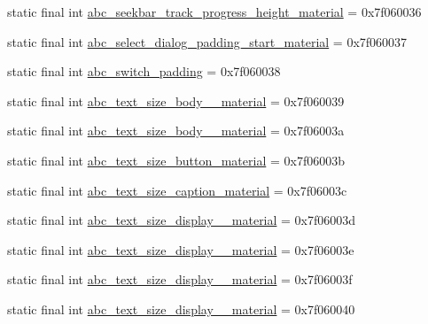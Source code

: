 \begin{DoxyCompactItemize}
\item 
static final int \mbox{\hyperlink{classandroid_1_1support_1_1design_1_1_r_1_1dimen_adbd12b1ded065c1a2ebba69f73914064}{abc\+\_\+seekbar\+\_\+track\+\_\+progress\+\_\+height\+\_\+material}} = 0x7f060036
\item 
static final int \mbox{\hyperlink{classandroid_1_1support_1_1design_1_1_r_1_1dimen_ab58598587f4f5fdc847a95cdc049cf52}{abc\+\_\+select\+\_\+dialog\+\_\+padding\+\_\+start\+\_\+material}} = 0x7f060037
\item 
static final int \mbox{\hyperlink{classandroid_1_1support_1_1design_1_1_r_1_1dimen_a68dfff3b44493d46ef4f342fe493b6f1}{abc\+\_\+switch\+\_\+padding}} = 0x7f060038
\item 
static final int \mbox{\hyperlink{classandroid_1_1support_1_1design_1_1_r_1_1dimen_ab0b6acfb59c02b2774843fb880ffcf8a}{abc\+\_\+text\+\_\+size\+\_\+body\+\_\+\_\+material}} = 0x7f060039
\item 
static final int \mbox{\hyperlink{classandroid_1_1support_1_1design_1_1_r_1_1dimen_a528fe8a33f9ff3e67b652f558ee25c2d}{abc\+\_\+text\+\_\+size\+\_\+body\+\_\+\_\+material}} = 0x7f06003a
\item 
static final int \mbox{\hyperlink{classandroid_1_1support_1_1design_1_1_r_1_1dimen_a88aed06e5c28e04e97f8b700b4e51593}{abc\+\_\+text\+\_\+size\+\_\+button\+\_\+material}} = 0x7f06003b
\item 
static final int \mbox{\hyperlink{classandroid_1_1support_1_1design_1_1_r_1_1dimen_a5cdfadc5f166849cf34b222d8d3f684e}{abc\+\_\+text\+\_\+size\+\_\+caption\+\_\+material}} = 0x7f06003c
\item 
static final int \mbox{\hyperlink{classandroid_1_1support_1_1design_1_1_r_1_1dimen_a691b8577be670e47f62cc11833ca1e7b}{abc\+\_\+text\+\_\+size\+\_\+display\+\_\+\_\+material}} = 0x7f06003d
\item 
static final int \mbox{\hyperlink{classandroid_1_1support_1_1design_1_1_r_1_1dimen_aa795c05c797d5e84e8e16eae582c74e0}{abc\+\_\+text\+\_\+size\+\_\+display\+\_\+\_\+material}} = 0x7f06003e
\item 
static final int \mbox{\hyperlink{classandroid_1_1support_1_1design_1_1_r_1_1dimen_af16a183a043f3ce464a8daec9e04da9a}{abc\+\_\+text\+\_\+size\+\_\+display\+\_\+\_\+material}} = 0x7f06003f
\item 
static final int \mbox{\hyperlink{classandroid_1_1support_1_1design_1_1_r_1_1dimen_a8e55855f262f4e761dd55609d351e8af}{abc\+\_\+text\+\_\+size\+\_\+display\+\_\+\_\+material}} = 0x7f060040
\item 

\end{DoxyCompactItemize}
